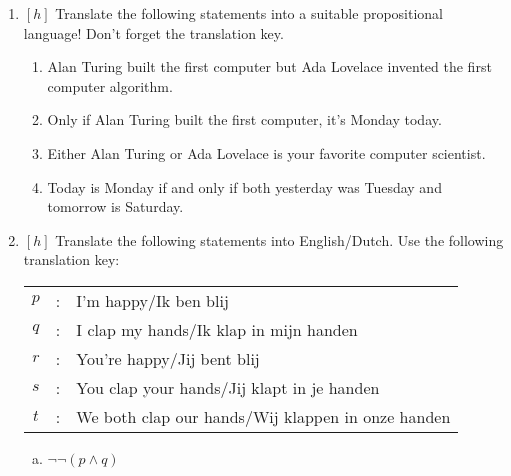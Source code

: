 	\begin{enumerate}[\thesection.1]
	
		\item $[h]$ Translate the following statements into a suitable propositional language! Don't forget the translation key.
			
			\begin{enumerate}

				\item Alan Turing built the first computer but Ada Lovelace invented the first computer algorithm.
			
				\item Only if Alan Turing built the first computer, it's Monday today.
			
				\item Either Alan Turing or Ada Lovelace is your favorite computer scientist.
			
				\item Today is Monday if and only if both yesterday was Tuesday and tomorrow is Saturday.
			
			\end{enumerate}

		\item $[h]$ Translate the following statements into English/Dutch. Use the following translation key: 
		
		\begin{center}
			\begin{tabular}{c c l}
		
			 $p$ & : & I'm happy/Ik ben blij\\[1ex]
			
			 $q$ & : & I clap my hands/Ik klap in mijn handen\\[1ex]
			
			 $r$ & : & You're happy/Jij bent blij\\[1ex]
			
			 $s$ & : & You clap your hands/Jij klapt in je handen\\[1ex]
			
			 $t$ & : & We both clap our hands/Wij klappen in onze handen
			 \end{tabular}
		
		\end{center}
		
		\begin{enumerate}[(a)]
		
			\item $\neg\neg (p\land q)$
		

\end{enumerate}
\end{enumerate}
